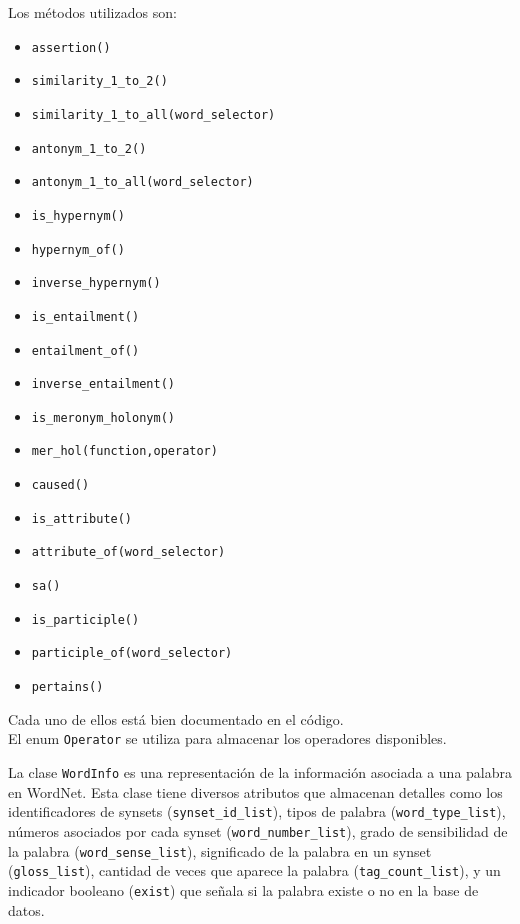 \documentclass[12pt]{article}
\begin{document}
Los métodos utilizados son:

\begin{itemize}
    \item \texttt{assertion()}
    \item \texttt{similarity\_1\_to\_2()}
    \item \texttt{similarity\_1\_to\_all(word\_selector)}
    \item \texttt{antonym\_1\_to\_2()}
    \item \texttt{antonym\_1\_to\_all(word\_selector)}
    \item \texttt{is\_hypernym()}
    \item \texttt{hypernym\_of()}
    \item \texttt{inverse\_hypernym()}
    \item \texttt{is\_entailment()}
    \item \texttt{entailment\_of()}
    \item \texttt{inverse\_entailment()}
    \item \texttt{is\_meronym\_holonym()}
    \item \texttt{mer\_hol(function,operator)}
    \item \texttt{caused()}
    \item \texttt{is\_attribute()}
    \item \texttt{attribute\_of(word\_selector)}
    \item \texttt{sa()}
    \item \texttt{is\_participle()}
    \item \texttt{participle\_of(word\_selector)}
    \item \texttt{pertains()}
\end{itemize}

Cada uno de ellos está bien documentado en el código.\\

El enum \texttt{Operator} se utiliza para almacenar los operadores disponibles.

La clase \texttt{WordInfo} es una representación de la información asociada a una palabra en WordNet. Esta clase tiene diversos atributos que almacenan detalles como los identificadores de synsets (\texttt{synset\_id\_list}), tipos de palabra (\texttt{word\_type\_list}), números asociados por cada synset (\texttt{word\_number\_list}), grado de sensibilidad de la palabra (\texttt{word\_sense\_list}), significado de la palabra en un synset (\texttt{gloss\_list}), cantidad de veces que aparece la palabra (\texttt{tag\_count\_list}), y un indicador booleano (\texttt{exist}) que señala si la palabra existe o no en la base de datos.
\end{document}
